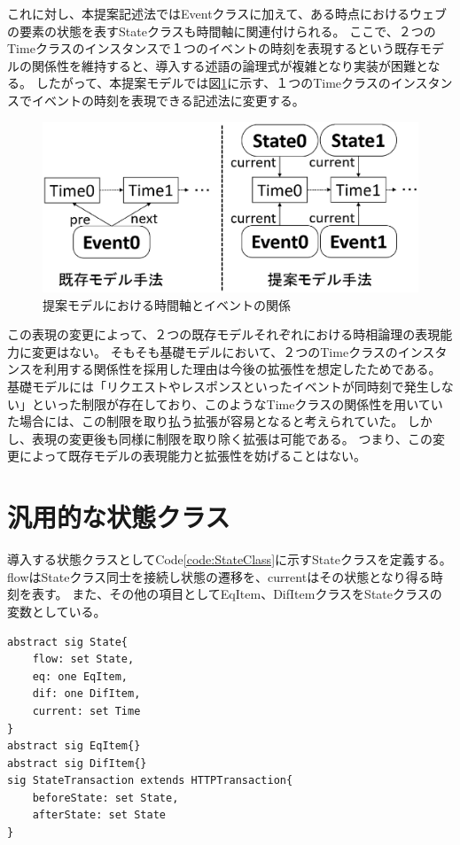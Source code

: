 \documentclass[12pt,a4paper]{jbook}
\begin{document}
これに対し、本提案記述法ではEventクラスに加えて、ある時点におけるウェブの要素の状態を表すStateクラスも時間軸に関連付けられる。
ここで、２つのTimeクラスのインスタンスで１つのイベントの時刻を表現するという既存モデルの関係性を維持すると、導入する述語の論理式が複雑となり実装が困難となる。
したがって、本提案モデルでは図\ref{fig:ProposedModel-TimeClass}に示す、１つのTimeクラスのインスタンスでイベントの時刻を表現できる記述法に変更する。

\begin{figure}[htb]
\centering
\includegraphics[width=450pt]{./fig/ProposedModel-TimeClass.eps}
\caption{提案モデルにおける時間軸とイベントの関係}
\label{fig:ProposedModel-TimeClass}
\end{figure}

この表現の変更によって、２つの既存モデルそれぞれにおける時相論理の表現能力に変更はない。
そもそも基礎モデルにおいて、２つのTimeクラスのインスタンスを利用する関係性を採用した理由は今後の拡張性を想定したためである。
基礎モデルには「リクエストやレスポンスといったイベントが同時刻で発生しない」といった制限が存在しており、このようなTimeクラスの関係性を用いていた場合には、この制限を取り払う拡張が容易となると考えられていた。
しかし、表現の変更後も同様に制限を取り除く拡張は可能である。
つまり、この変更によって既存モデルの表現能力と拡張性を妨げることはない。

\section{汎用的な状態クラス}
\label{sec:state-class}
導入する状態クラスとしてCode\ref{code:StateClass}に示すStateクラスを定義する。
flowはStateクラス同士を接続し状態の遷移を、currentはその状態となり得る時刻を表す。
また、その他の項目としてEqItem、DifItemクラスをStateクラスの変数としている。
\begin{lstlisting}[caption=Stateクラス, label=code:StateClass]
abstract sig State{
	flow: set State,
	eq: one EqItem,
	dif: one DifItem,
	current: set Time
}
abstract sig EqItem{}
abstract sig DifItem{}
sig StateTransaction extends HTTPTransaction{
	beforeState: set State,
	afterState: set State
}
\end{lstlisting}
\end{document}
